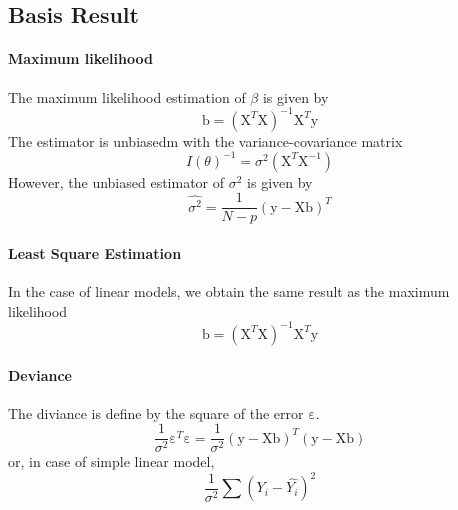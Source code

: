 \subsection{Basis Result}

\paragraph{Maximum likelihood}
The maximum likelihood estimation of $\beta$ is given by
\[ \mathrm{b} = (\mathrm{X}^T \mathrm{X})^{-1} \mathrm{X}^T \mathrm{y} \]
The estimator is unbiasedm with the variance-covariance matrix
\[ I(\theta)^{-1} = \sigma^2 (\mathrm{X}^T \mathrm{X}^{-1}) \]
However, the unbiased estimator of $\sigma^2$ is given by
\[ \hat{\sigma^2} = \frac{1}{N-p} (\mathrm{y} - \mathrm{X}\mathrm{b})^T \]

\paragraph{Least Square Estimation}
In the case of linear models, we obtain the same result as the maximum likelihood
\[ \mathrm{b} = (\mathrm{X}^T \mathrm{X})^{-1} \mathrm{X}^T \mathrm{y} \]

\paragraph{Deviance}
The diviance is define by the square of the error $\mathrm{\varepsilon}$.
\[ \frac{1}{\sigma^2} \mathrm{\varepsilon}^T \mathrm{\varepsilon} = \frac{1}{\sigma^2} (\mathrm{y} - \mathrm{X}\mathrm{b})^T(\mathrm{y} - \mathrm{X}\mathrm{b}) \]
or, in case of simple linear model,
\[ \frac{1}{\sigma^2} \sum (Y_i - \hat{Y_i})^2 \]

